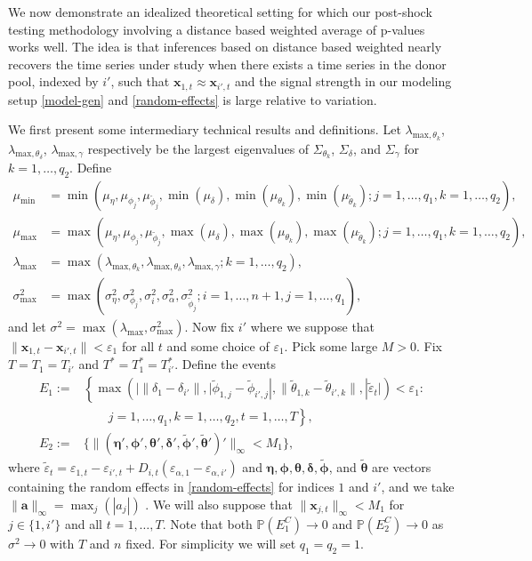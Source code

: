 \documentclass[11pt]{article}
\newcommand{\x}{\textbf{x}}
\newcommand{\Prob}{\mathbb{P}}
\theoremstyle{definition}
\begin{document}
We now demonstrate an idealized theoretical setting for which our post-shock testing methodology involving a distance based weighted average of p-values works well. The idea is that inferences based on distance based weighted nearly recovers the time series under study when there exists a time series in the donor pool, indexed by $i'$, such that $\x_{1,t} \approx \x_{i',t}$ and the signal strength in our modeling setup \eqref{model-gen} and \eqref{random-effects} is large relative to variation. 

We first present some intermediary technical results and definitions. Let $\lambda_{\text{max},\theta_k}$, $\lambda_{\text{max},\theta_\delta}$, $\lambda_{\text{max},\gamma}$ respectively be the largest eigenvalues of $\Sigma_{\theta_k}$, $\Sigma_{\delta}$, and $\Sigma_{\gamma}$ for $k = 1,\ldots,q_2$. Define  
\begin{align*}
  \mu_{\min} &= \min\left(\mu_\eta,\mu_{\phi_j},\mu_{\tilde\phi_j},\min(\mu_\delta),\min(\mu_{\theta_k}),\min(\mu_{\tilde\theta_k}); j = 1,\ldots,q_1, k = 1,\ldots,q_2\right), \\
  \mu_{\max} &= \max\left(\mu_\eta,\mu_{\phi_j},\mu_{\tilde\phi_j},\max(\mu_\delta),\max(\mu_{\theta_k}),\max(\mu_{\tilde\theta_k}); j = 1,\ldots,q_1, k = 1,\ldots,q_2\right), \\
  \lambda_{\max} &= \max\left(\lambda_{\text{max},\theta_k}, \lambda_{\text{max},\theta_\delta}, \lambda_{\text{max},\gamma}; k = 1,\ldots,q_2\right), \\
  \sigma^2_{\max} &= \max\left(\sigma^2_{\eta},\sigma^2_{\phi_j},\sigma^2_i,\sigma^2_{\alpha},\sigma^2_{\tilde{\phi}_j}; i = 1,\ldots,n+1, j = 1,\ldots,q_1\right),
\end{align*}
and let $\sigma^2 = \max(\lambda_{\max}, \sigma^2_{\max})$. Now fix $i'$ where we suppose that $\|\x_{1,t} - \x_{i',t}\| < \varepsilon_1$ for all $t$ and some choice of $\varepsilon_1$. Pick some large $M > 0$. Fix $T = T_1 = T_{i'}$ and $T^* = T^*_1 = T^*_{i'}$. Define the events 
\begin{align*}
  E_1 := &\left\{\max\left(|\|\delta_1 - \delta_{i'}\|,|\tilde\phi_{1,j}-\tilde\phi_{i',j}|,\|\tilde\theta_{1,k}-\tilde\theta_{i',k}\|,|\tilde\varepsilon_t|\right) < \varepsilon_1:\right. \\
  &\qquad j = 1,\ldots,q_1, k = 1,\ldots,q_2, t = 1,\ldots,T \left.\right\}, \\
  E_2 := &\{\|(\bm{\eta}',\bm{\phi}',\bm{\theta}',\bm{\delta}',\tilde{\bm{\phi}}',\tilde{\bm{\theta}}')'\|_\infty < M_1\},  
\end{align*}
where $\tilde\varepsilon_t = \varepsilon_{1,t} - \varepsilon_{i',t} + D_{i,t}(\varepsilon_{\alpha,1} - \varepsilon_{\alpha,i'})$ and $\bm{\eta},\bm{\phi},\bm{\theta},\bm{\delta},\tilde{\bm{\phi}}$, and $\tilde{\bm{\theta}}$ are vectors containing the random effects in \eqref{random-effects} for indices $1$ and $i'$, and we take $\|\bm{a}\|_\infty = \max_j(|a_j|)$ . We will also suppose that $\|\x_{j,t}\|_\infty < M_1$ for $j \in \{1,i'\}$ and all $t = 1,\ldots,T$. Note that both $\Prob(E_1^C) \to 0$ and $\Prob(E_2^C) \to 0$  as $\sigma^2 \to 0$ with $T$ and $n$ fixed. For simplicity we will set $q_1 = q_2 = 1$. 
\end{document}
